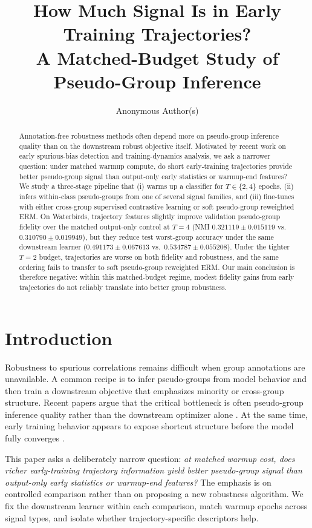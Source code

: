 \documentclass{article}
\title{How Much Signal Is in Early Training Trajectories?\\A Matched-Budget Study of Pseudo-Group Inference}
\author{Anonymous Author(s)}
\date{}
\newcommand{\nmi}{\textsc{NMI}}
\begin{document}
\maketitle

\begin{abstract}
Annotation-free robustness methods often depend more on pseudo-group inference quality than on the downstream robust objective itself. Motivated by recent work on early spurious-bias detection and training-dynamics analysis, we ask a narrower question: under matched warmup compute, do short early-training trajectories provide better pseudo-group signal than output-only early statistics or warmup-end features? We study a three-stage pipeline that (i) warms up a classifier for $T \in \{2,4\}$ epochs, (ii) infers within-class pseudo-groups from one of several signal families, and (iii) fine-tunes with either cross-group supervised contrastive learning or soft pseudo-group reweighted ERM. On Waterbirds, trajectory features slightly improve validation pseudo-group fidelity over the matched output-only control at $T=4$ (\nmi{} $0.321119 \pm 0.015119$ vs.\ $0.310790 \pm 0.019949$), but they reduce test worst-group accuracy under the same downstream learner ($0.491173 \pm 0.067613$ vs.\ $0.534787 \pm 0.055208$). Under the tighter $T=2$ budget, trajectories are worse on both fidelity and robustness, and the same ordering fails to transfer to soft pseudo-group reweighted ERM. Our main conclusion is therefore negative: within this matched-budget regime, modest fidelity gains from early trajectories do not reliably translate into better group robustness.
\end{abstract}

\section{Introduction}
Robustness to spurious correlations remains difficult when group annotations are unavailable. A common recipe is to infer pseudo-groups from model behavior and then train a downstream objective that emphasizes minority or cross-group structure. Recent papers argue that the critical bottleneck is often pseudo-group inference quality rather than the downstream optimizer alone \citep{han2024improving,chakraborty2024exmap,zheng2024selfguided}. At the same time, early training behavior appears to expose shortcut structure before the model fully converges \citep{yang2024spare,murali2023beyond}.

This paper asks a deliberately narrow question: \emph{at matched warmup cost, does richer early-training trajectory information yield better pseudo-group signal than output-only early statistics or warmup-end features?} The emphasis is on controlled comparison rather than on proposing a new robustness algorithm. We fix the downstream learner within each comparison, match warmup epochs across signal types, and isolate whether trajectory-specific descriptors help.
\end{document}
